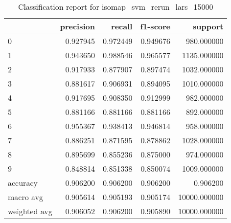 \begin{table}[htb!]
\centering
\caption{Classification report for isomap_svm_rerun_lars_15000}
\label{tab:classification-report-isomap_svm_rerun_lars_15000}
\begin{tabular}{lrrrr}
\toprule
 & precision & recall & f1-score & support \\
\midrule
0 & 0.927945 & 0.972449 & 0.949676 & 980.000000 \\
1 & 0.943650 & 0.988546 & 0.965577 & 1135.000000 \\
2 & 0.917933 & 0.877907 & 0.897474 & 1032.000000 \\
3 & 0.881617 & 0.906931 & 0.894095 & 1010.000000 \\
4 & 0.917695 & 0.908350 & 0.912999 & 982.000000 \\
5 & 0.881166 & 0.881166 & 0.881166 & 892.000000 \\
6 & 0.955367 & 0.938413 & 0.946814 & 958.000000 \\
7 & 0.886251 & 0.871595 & 0.878862 & 1028.000000 \\
8 & 0.895699 & 0.855236 & 0.875000 & 974.000000 \\
9 & 0.848814 & 0.851338 & 0.850074 & 1009.000000 \\
accuracy & 0.906200 & 0.906200 & 0.906200 & 0.906200 \\
macro avg & 0.905614 & 0.905193 & 0.905174 & 10000.000000 \\
weighted avg & 0.906052 & 0.906200 & 0.905890 & 10000.000000 \\
\bottomrule
\end{tabular}
\end{table}
